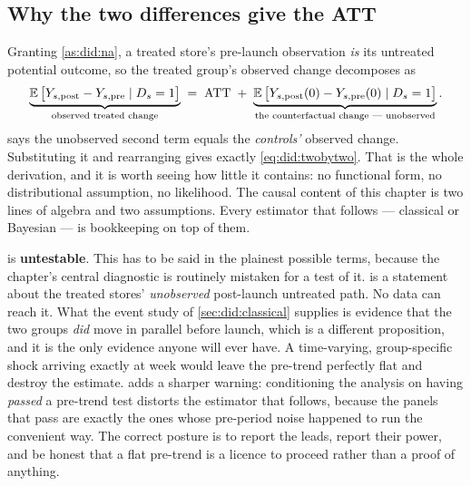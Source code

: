 \subsection*{Why the two differences give the ATT}

Granting \cref{as:did:na}, a treated store's pre-launch observation \emph{is} its untreated
potential outcome, so the treated group's observed change decomposes as
%
\begin{equation}
  \underbrace{\operatorname{\mathbb{E}}\big[Y_{s,\text{post}} - Y_{s,\text{pre}} \mid D_s = 1\big]}_{\text{observed treated change}}
  \;=\;
  \text{ATT}
  \;+\;
  \underbrace{\operatorname{\mathbb{E}}\big[Y_{s,\text{post}}(0) - Y_{s,\text{pre}}(0) \mid D_s = 1\big]}_{\text{the counterfactual change --- unobserved}} .
  \label{eq:did:decomp}
\end{equation}
%
 says the unobserved second term equals the \emph{controls'} observed change.
Substituting it and rearranging gives exactly \cref{eq:did:twobytwo}. That is the whole derivation,
and it is worth seeing how little it contains: no functional form, no distributional assumption, no
likelihood. The causal content of this chapter is two lines of algebra and two assumptions. Every
estimator that follows --- classical or Bayesian --- is bookkeeping on top of them.

\begin{remark}
 is \textbf{untestable}. This has to be said in the plainest possible terms,
because the chapter's central diagnostic is routinely mistaken for a test of it.
 is a statement about the treated stores' \emph{unobserved} post-launch untreated
path. No data can reach it. What the event study of \cref{sec:did:classical} supplies is evidence
that the two groups \emph{did} move in parallel before launch, which is a different proposition, and
it is the only evidence anyone will ever have. A time-varying, group-specific shock arriving
exactly at week \nbEightLaunch{} would leave the pre-trend perfectly flat and destroy the estimate.
 adds a sharper warning: conditioning the analysis on having \emph{passed} a
pre-trend test distorts the estimator that follows, because the panels that pass are exactly the
ones whose pre-period noise happened to run the convenient way. The correct posture is to report
the leads, report their power, and be honest that a flat pre-trend is a licence to proceed rather
than a proof of anything.
\end{remark}

